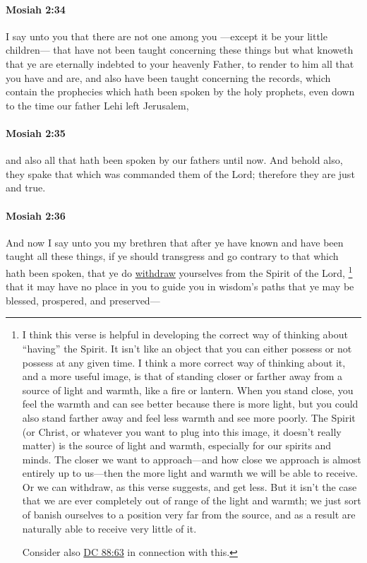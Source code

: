 		\paragraph{Mosiah 2:34} %
			\label{MOSIAH-2-34}

			I say unto you that there are not one among you
			---except it be your little children---
			that have not been taught concerning these things
			but what knoweth that ye are eternally indebted to your heavenly Father,
			to render to him all that you have and are,
			and also have been taught concerning the records,
			which contain the prophecies which hath been spoken by the holy prophets,
			even down to the time our father Lehi left Jerusalem,

		\paragraph{Mosiah 2:35} %
			\label{MOSIAH-2-35}

			and also all that hath been spoken by our fathers until now.
			And behold also, they spake that which was commanded them of the Lord;
			therefore they are just and true.

		\paragraph{Mosiah 2:36} %
			\label{MOSIAH-2-36}

			And now I say unto you my brethren that
			after ye have known and have been taught all these things,
			if ye should transgress and go contrary to that which hath been spoken,
			that ye do \hyperref[WITHDRAW]{withdraw} yourselves from the Spirit of the Lord,%
				\footnote{%
					I think this verse is helpful in developing the correct way of thinking about ``having'' the Spirit. It isn't like an object that you can either possess or not possess at any given time. I think a more correct way of thinking about it, and a more useful image, is that of standing closer or farther away from a source of light and warmth, like a fire or lantern. When you stand close, you feel the warmth and can see better because there is more light, but you could also stand farther away and feel less warmth and see more poorly. The Spirit (or Christ, or whatever you want to plug into this image, it doesn't really matter) is the source of light and warmth, especially for our spirits and minds. The closer we want to approach---and how close we approach is almost entirely up to us---then the more light and warmth we will be able to receive. Or we can withdraw, as this verse suggests, and get less. But it isn't the case that we are ever completely out of range of the light and warmth; we just sort of banish ourselves to a position very far from the source, and as a result are naturally able to receive very little of it.
					
					Consider also \hyperref[DC88-63]{DC 88:63} in connection with this.
					}
			that it may have no place in you to guide you in wisdom's paths
			that ye may be blessed, prospered, and preserved---

